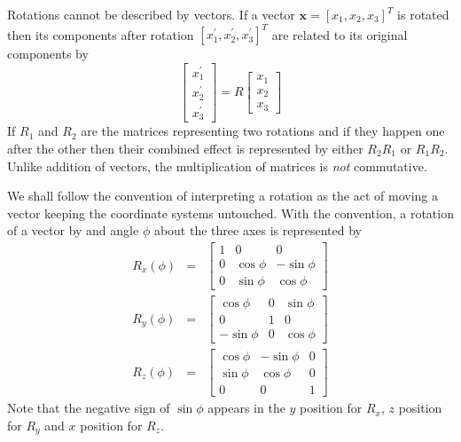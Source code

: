 \documentclass{article}
\numberwithin{equation}{section}
\let\vec\bm
\begin{document}
Rotations cannot be described by vectors. If a vector $\vec{x} =
[x_1, x_2, x_3]^T$ is rotated then its components after rotation $[x_1^\prime, 
x_2^\prime, x_3^\prime]^T$ are related to its original components by 
\begin{equation}\label{s2e1}
\begin{bmatrix}x_1^\prime \\ x_2^\prime \\ x_3^\prime\end{bmatrix} = 
R\begin{bmatrix}x_1 \\ x_2 \\ x_3\end{bmatrix} 
\end{equation}
If $R_1$ and $R_2$ are the matrices representing two rotations and if they 
happen one after the other then their combined effect is represented by either
$R_2R_1$ or $R_1R_2$. Unlike addition of vectors, the multiplication of
matrices is \emph{not} commutative.

We shall follow the convention of interpreting a rotation as the act of moving
a vector keeping the coordinate systems untouched. With the convention, a
rotation of a vector by and angle $\phi$ about the three axes is represented
by
\begin{eqnarray}
R_x(\phi) &=& \begin{bmatrix}1 & 0 & 0 \\
0 & \cos\phi & -\sin\phi \\
0 & \sin\phi & \cos\phi
\end{bmatrix} \label{s2e2} \\
R_y(\phi) &=& \begin{bmatrix}\cos\phi & 0 & \sin\phi \\
0 & 1 & 0 \\
-\sin\phi & 0 & \cos\phi
\end{bmatrix} \label{s2e3} \\
R_z(\phi) &=& \begin{bmatrix}\cos\phi & -\sin\phi & 0 \\
\sin\phi & \cos\phi & 0 \\
0 & 0 & 1
\end{bmatrix} \label{s2e4}
\end{eqnarray}
Note that the negative sign of $\sin\phi$ appears in the $y$ position for $R_x$,
 $z$ position for $R_y$ and $x$ position for $R_z$.
\end{document}
